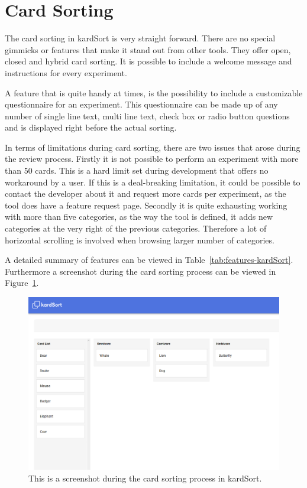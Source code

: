 \section{Card Sorting}
The card sorting in kardSort is very straight forward. There are no 
special gimmicks or features that make it stand out from other tools.
They offer open, closed and hybrid card sorting. It is possible to
include a welcome message and instructions for every experiment.

A feature that is quite handy at times, is the possibility to include
a customizable questionnaire for an experiment. This questionnaire can
be made up of any number of single line text, multi line text,
check box or radio button questions and is displayed right before the
actual sorting.

In terms of limitations during card sorting, there are two issues that arose
during the review process. Firstly it is not possible to perform an experiment
with more than 50 cards. This is a hard limit set during development that
offers no workaround by a user. If this is a deal-breaking limitation, it
could be possible to contact the developer about it and request more cards per
experiment, as the tool does have a feature request page. Secondly it is quite
exhausting working with more than five categories, as the way the tool is
defined, it adds new categories at the very right of the previous categories.
Therefore a lot of horizontal scrolling is involved when browsing larger
number of categories.

A detailed summary of features can be viewed in
Table~\ref{tab:features-kardSort}. Furthermore a screenshot during the
card sorting process can be viewed in Figure~\ref{fig:kardSort2}.

\begin{figure}[tp] 
\centering
\includegraphics[keepaspectratio,width=\linewidth,height=\halfh]{images/kardsort-sorting.png}
\caption[kardSort Card Sorting] { This is a screenshot during the card
sorting process in kardSort.
 }
\label{fig:kardSort2}
\end{figure}


